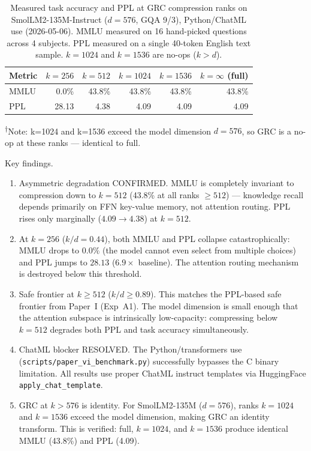 \documentclass[11pt]{article}
\begin{document}
\begin{table}[h]\centering\small
\caption{Measured task accuracy and PPL at GRC compression ranks on
SmolLM2-135M-Instruct ($d{=}576$, GQA 9/3), Python/ChatML use (2026-05-06).
MMLU measured on 16 hand-picked questions across 4 subjects.
PPL measured on a single 40-token English text sample.
$k{=}1024$ and $k{=}1536$ are no-ops ($k > d$).}
\label{tab:f1-measured}
\begin{tabular}{@{}lrrrrr@{}}
\toprule
Metric  & $k{=}256$ & $k{=}512$ & $k{=}1024$ & $k{=}1536$ & $k{=}\infty$ (full) \\
\midrule
MMLU    & 0.0\%  & 43.8\% & 43.8\% & 43.8\% & 43.8\% \\
PPL     & 28.13 & 4.38  & 4.09  & 4.09  & 4.09 \\
\bottomrule
\end{tabular}
\end{table}

\smallskip
\noindent\textsuperscript{$\dagger$}Note: k=1024 and k=1536 exceed the model
dimension $d{=}576$, so GRC is a no-op at these ranks --- identical to full.

Key findings.
\begin{enumerate}
\item Asymmetric degradation CONFIRMED.  MMLU is completely invariant
      to compression down to $k{=}512$ (43.8\% at all ranks ${\ge}512$) ---
      knowledge recall depends primarily on FFN key-value memory, not
      attention routing.  PPL rises only marginally ($4.09{\to}4.38$)
      at $k{=}512$.
\item At $k{=}256$ ($k/d{=}0.44$), both MMLU and PPL collapse
      catastrophically: MMLU drops to $0.0\%$ (the model cannot even
      select from multiple choices) and PPL jumps to $28.13$ ($6.9\times$
      baseline).  The attention routing mechanism is destroyed below
      this threshold.
\item Safe frontier at $k{\ge}512$ ($k/d{\ge}0.89$).  This matches
      the PPL-based safe frontier from Paper~I (Exp~A1).  The model
      dimension is small enough that the attention subspace is
      intrinsically low-capacity: compressing below $k{=}512$ degrades
      both PPL and task accuracy simultaneously.
\item ChatML blocker RESOLVED.  The Python/transformers use
      (\texttt{scripts/paper\_vi\_benchmark.py}) successfully bypasses
      the C binary limitation.  All results use proper ChatML instruct
      templates via HuggingFace \texttt{apply\_chat\_template}.
\item GRC at $k{>}576$ is identity.  For SmolLM2-135M ($d{=}576$),
      ranks $k{=}1024$ and $k{=}1536$ exceed the model dimension,
      making GRC an identity transform.  This is verified: full,
      $k{=}1024$, and $k{=}1536$ produce identical MMLU (43.8\%)
      and PPL (4.09).
\end{enumerate}
\end{document}
